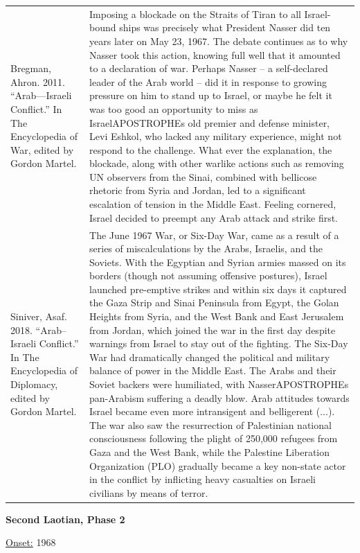 {\begin{longtable}{p{}p{}}
\\
Bregman, Ahron. 2011. “Arab—Israeli Conflict.” In The Encyclopedia of War, edited by Gordon Martel. & Imposing a blockade on the Straits of Tiran to all Israel-bound ships was precisely what President Nasser did ten years later on May 23, 1967. The debate continues as to why Nasser took this action, knowing full well that it amounted to a declaration of war. Perhaps Nasser – a self-declared leader of the Arab world – did it in response to growing pressure on him to stand up to Israel, or maybe he felt it was too good an opportunity to miss as IsraelAPOSTROPHEs old premier and defense minister, Levi Eshkol, who lacked any military experience, might not respond to the challenge. What ever the explanation, the blockade, along with other warlike actions such as removing UN observers from the Sinai, combined with bellicose rhetoric from Syria and Jordan, led to a significant escalation of tension in the Middle East. Feeling cornered, Israel decided to preempt any Arab attack and strike first.
\\
Siniver, Asaf. 2018. “Arab–Israeli Conflict.” In The Encyclopedia of Diplomacy, edited by Gordon Martel. & The June 1967 War, or Six-Day War, came as a result of a series of miscalculations by the Arabs, Israelis, and the Soviets. With the Egyptian and Syrian armies massed on its borders (though not assuming offensive postures), Israel launched pre-emptive strikes and within six days it captured the Gaza Strip and Sinai Peninsula from Egypt, the Golan Heights from Syria, and the West Bank and East Jerusalem from Jordan, which joined the war in the first day despite warnings from Israel to stay out of the fighting. The Six-Day War had dramatically changed the political and military balance of power in the Middle East. The Arabs and their Soviet backers were humiliated, with NasserAPOSTROPHEs pan-Arabism suffering a deadly blow. Arab attitudes towards Israel became even more intransigent and belligerent (...). The war also saw the resurrection of Palestinian national consciousness following the plight of 250,000 refugees from Gaza and the West Bank, while the Palestine Liberation Organization (PLO) gradually became a key non-state actor in the conflict by inflicting heavy casualties on Israeli civilians by means of terror.
\\
\end{longtable}}
\clearpage
         \textbf{Second Laotian, Phase 2} 

          \underline{Onset:} 1968         

